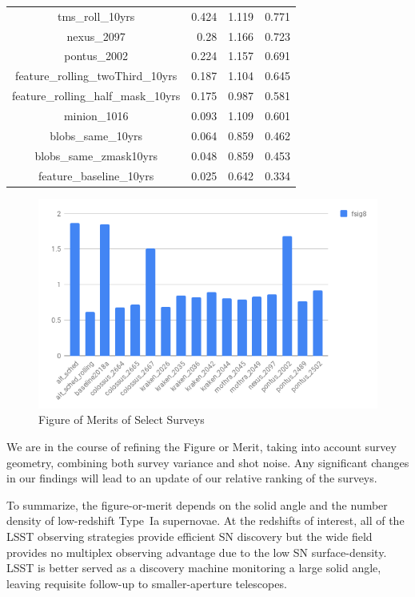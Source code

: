 \documentclass[a4paper,10pt]{article}
\begin{document}
\begin{table}
\begin{tabular}{|c|rrr|}
tms\_roll\_10yrs & 0.424 & 1.119 & 0.771  \\
nexus\_2097 & 0.28 & 1.166 & 0.723  \\
pontus\_2002 & 0.224 & 1.157 & 0.691  \\
feature\_rolling\_twoThird\_10yrs & 0.187 & 1.104 & 0.645  \\
feature\_rolling\_half\_mask\_10yrs & 0.175 & 0.987 & 0.581  \\
minion\_1016 & 0.093 & 1.109 & 0.601  \\
blobs\_same\_10yrs & 0.064 & 0.859 & 0.462  \\
blobs\_same\_zmask10yrs & 0.048 & 0.859 & 0.453  \\
feature\_baseline\_10yrs & 0.025 & 0.642 & 0.334  \\
\hline
\end{tabular}
\end{table}

\begin{figure}[htbp]
   \begin{center}
   \includegraphics[scale=0.5]{chart.png} %
   \caption{Figure of Merits of Select Surveys}
   \label{fig:fom}
   \end{center}
\end{figure}

We are in the course of refining the Figure or Merit, taking into account survey geometry, combining both survey variance and shot noise.
Any significant changes in our findings will lead to an update of our relative ranking of the surveys.

To summarize, the figure-or-merit depends on the solid angle and the number density of low-redshift Type~Ia supernovae.  At the redshifts of interest,
all of the LSST observing strategies provide efficient SN discovery but the wide field
provides no multiplex observing advantage due to the low SN surface-density.  LSST is better served as a discovery machine monitoring 
a large solid angle, leaving requisite follow-up to smaller-aperture telescopes.
\end{document}
